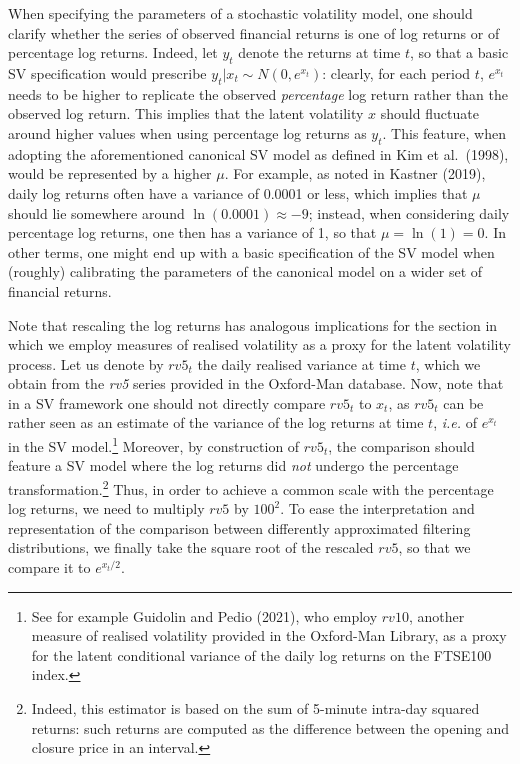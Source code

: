 \documentclass[
]{book}
\theoremstyle{break}
\theoremstyle{nonumberplain}
\begin{document}
When specifying the parameters of a stochastic volatility model, one
should clarify whether the series of observed financial returns is one
of log returns or of percentage log returns. Indeed, let \(y_t\) denote
the returns at time \(t\), so that a basic SV specification would
prescribe \(y_t|x_t\sim N(0,e^{x_t})\): clearly, for each period \(t\),
\(e^{x_t}\) needs to be higher to replicate the observed
\textit{percentage} log return rather than the observed log return. This
implies that the latent volatility \(x\) should fluctuate around higher
values when using percentage log returns as \(y_t\). This feature, when
adopting the aforementioned canonical SV model as defined in Kim et
al.~(1998), would be represented by a higher \(\mu\). For example, as
noted in Kastner (2019), daily log returns often have a variance of
0.0001 or less, which implies that \(\mu\) should lie somewhere around
\(\ln(0.0001)\approx -9\); instead, when considering daily percentage
log returns, one then has a variance of 1, so that \(\mu=\ln(1)=0\). In
other terms, one might end up with a basic specification of the SV model
when (roughly) calibrating the parameters of the canonical model on a
wider set of financial returns.

Note that rescaling the log returns has analogous implications for the
section in which we employ measures of realised volatility as a proxy
for the latent volatility process. Let us denote by \(rv5_t\) the daily
realised variance at time \(t\), which we obtain from the \textit{rv5}
series provided in the Oxford-Man database. Now, note that in a SV
framework one should not directly compare \(rv5_t\) to \(x_t\), as
\(rv5_t\) can be rather seen as an estimate of the variance of the log
returns at time \(t\), \textit{i.e.} of \(e^{x_t}\) in the SV
model.\footnote{See for example Guidolin and Pedio (2021), who employ $rv10$, another measure of realised volatility provided in the Oxford-Man Library, as a proxy for the latent conditional variance of the daily log returns on the FTSE100 index.}
Moreover, by construction of \(rv5_t\), the comparison should feature a
SV model where the log returns did \textit{not} undergo the percentage
transformation.\footnote{Indeed, this estimator is based on the sum of 5-minute intra-day squared returns: such returns are computed as the difference between the opening and closure price in an interval.}
Thus, in order to achieve a common scale with the percentage log
returns, we need to multiply \(rv5\) by \(100^2\). To ease the
interpretation and representation of the comparison between differently
approximated filtering distributions, we finally take the square root of
the rescaled \(rv5\), so that we compare it to \(e^{x_t/2}\).
\end{document}
